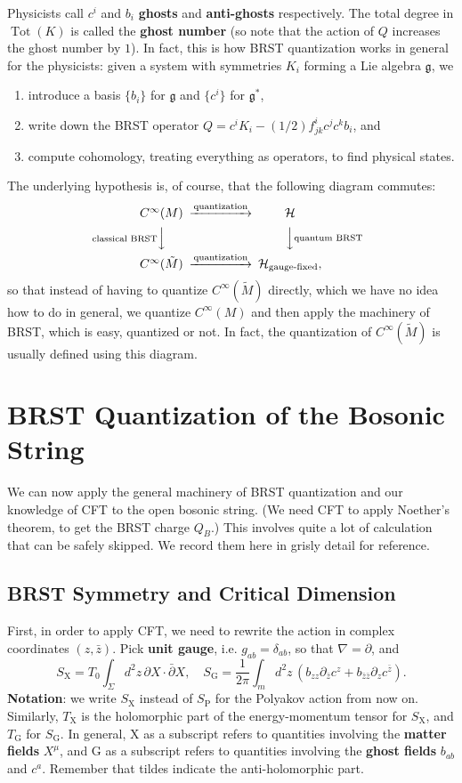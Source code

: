 \documentclass{report}
\theoremstyle{plain}
\theoremstyle{definition}
\theoremstyle{remark}
\newcommand{\di}{\partial}
\newcommand{\cH}{\mathcal{H}}
\newcommand{\fg}{\mathfrak{g}}
\DeclareMathOperator{\Tot}{Tot}
\newcommand{\bz}{\bar{z}}
\newcommand{\bdi}{\bar{\di}}
\begin{document}
Physicists call $c^i$ and $b_i$ {\bf ghosts} and {\bf anti-ghosts}
respectively. The total degree in $\Tot(K)$ is called the {\bf ghost
  number} (so note that the action of $Q$ increases the ghost number
by $1$). In fact, this is how BRST quantization works in general for
the physicists: given a system with symmetries $K_i$ forming a Lie
algebra $\fg$, we
\begin{enumerate}
\item introduce a basis $\{b_i\}$ for $\fg$ and $\{c^i\}$ for $\fg^*$,
\item write down the BRST operator $Q = c^i K_i - (1/2)f^i_{jk} c^j
  c^k b_i$, and
\item compute cohomology, treating everything as operators, to find
  physical states.
\end{enumerate}
The underlying hypothesis is, of course, that the following diagram
commutes:
\[ \begin{CD}
  C^\infty(M) @>\text{quantization}>> \cH \\
  @V\text{classical BRST}VV @VV\text{quantum BRST}V \\
  C^\infty(\tilde{M}) @>\text{quantization}>> \cH_{\text{gauge-fixed}},
\end{CD} \]
so that instead of having to quantize $C^\infty(\tilde{M})$ directly,
which we have no idea how to do in general, we quantize $C^\infty(M)$
and then apply the machinery of BRST, which is easy, quantized or not.
In fact, the quantization of $C^\infty(\tilde{M})$ is usually defined
using this diagram.

\section{BRST Quantization of the Bosonic String}

We can now apply the general machinery of BRST quantization and our
knowledge of CFT to the open bosonic string. (We need CFT to apply
Noether's theorem, to get the BRST charge $Q_B$.) This involves quite
a lot of calculation that can be safely skipped. We record them here
in grisly detail for reference.

\subsection{BRST Symmetry and Critical Dimension}

First, in order to apply CFT, we need to rewrite the action in complex
coordinates $(z, \bz)$. Pick {\bf unit gauge}, i.e. $g_{ab} =
\delta_{ab}$, so that $\nabla = \di$, and
\[ S_{\text{X}} = T_0 \int_\Sigma d^2z \, \di X \cdot \bdi X, \quad S_{\text{G}} = \frac{1}{2\pi} \int_m d^2z \, \left(b_{zz} \di_{\bz} c^z + b_{\bz\bz} \di_z c^{\bz}\right). \]
{\bf Notation}: we write $S_{\text{X}}$ instead of $S_{\text{P}}$ for
the Polyakov action from now on. Similarly, $T_{\text{X}}$ is the
holomorphic part of the energy-momentum tensor for $S_{\text{X}}$, and
$T_{\text{G}}$ for $S_{\text{G}}$. In general, X as a subscript refers
to quantities involving the {\bf matter fields} $X^\mu$, and G as a
subscript refers to quantities involving the {\bf ghost fields}
$b_{ab}$ and $c^a$. Remember that tildes indicate the anti-holomorphic
part.
\end{document}
